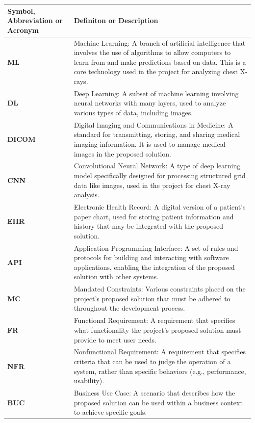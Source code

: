 \documentclass[12pt, titlepage]{article}
\begin{document}
\begin{longtable}[c]{|p{}|p{}|}
  \hline
  \textbf{Symbol, Abbreviation or Acronym} & \textbf{Definiton or Description} \\ \hline
  \textbf{ML} & Machine Learning: A branch of artificial intelligence that involves the use of algorithms to allow computers to learn from and make predictions based on data. This is a core technology used in the project for analyzing chest X-rays. \\ \hline
  \textbf{DL} & Deep Learning: A subset of machine learning involving neural networks with many layers, used to analyze various types of data, including images. \\ \hline
  \textbf{DICOM} & Digital Imaging and Communications in Medicine: A standard for transmitting, storing, and sharing medical imaging information. It is used to manage medical images in the proposed solution. \\ \hline
  \textbf{CNN} & Convolutional Neural Network: A type of deep learning model specifically designed for processing structured grid data like images, used in the project for chest X-ray analysis. \\ \hline
  \textbf{EHR} & Electronic Health Record: A digital version of a patient's paper chart, used for storing patient information and history that may be integrated with the proposed solution. \\ \hline
  \textbf{API} & Application Programming Interface: A set of rules and protocols for building and interacting with software applications, enabling the integration of the proposed solution with other systems. \\ \hline
  \textbf{MC} & Mandated Constraints: Various constraints placed on the project’s proposed solution that must be adhered to throughout the development process. \\ \hline
  \textbf{FR} & Functional Requirement: A requirement that specifies what functionality the project’s proposed solution must provide to meet user needs. \\ \hline
  \textbf{NFR} & Nonfunctional Requirement: A requirement that specifies criteria that can be used to judge the operation of a system, rather than specific behaviors (e.g., performance, usability). \\ \hline
  \textbf{BUC} & Business Use Case: A scenario that describes how the proposed solution can be used within a business context to achieve specific goals. \\ \hline

\end{longtable}
\end{document}
